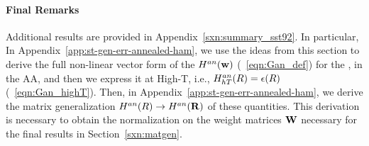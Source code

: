 \paragraph{Final Remarks}
Additional results are provided in Appendix~\ref{sxn:summary_sst92}. In particular, 
In Appendix~\ref{app:st-gen-err-annealed-ham}, we use the ideas from this section to derive the full non-linear vector form of the \AnnealedHamiltonian $H^{an}({\mathbf{w}})$ (\EQN~\ref{eqn:Gan_def})
for the \LinearPerceptron, in the AA, and then we express it at High-T, i.e.,
$H^{an}_{hT}(R)=\epsilon(R)$ (\EQN~\ref{eqn:Gan_highT}).  
Then, in Appendix~\ref{app:st-gen-err-annealed-ham}, we derive the matrix generalization
$H^{an}(R)\rightarrow H^{an}(\mathbf{R})$ of these quantities.
This derivation is necessary to obtain the normalization on the weight matrices ${\mathbf{W}}$ necessary for the final results in Section~\ref{sxn:matgen}.